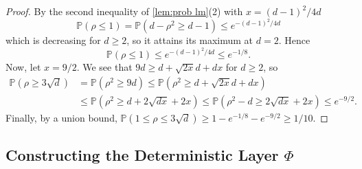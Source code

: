 \documentclass[aoap]{imsart}
\numberwithin{equation}{section}
\theoremstyle{definition}
\theoremstyle{remark}
\numberwithin{equation}{section}
\newcommand{\0}{\mathbf{0}}
\newcommand{\1}{\mathbf{1}}
\renewcommand{\P}{\mathbb{P}}
\numberwithin{equation}{section}
\begin{document}
\begin{proof} 
By the second inequality of \cref{lem:prob lm}(2) with $x=(d-1)^2/4d$ \[ \P(\rho\leq 1)=\P(d-\rho^2\geq d-1)\leq e^{-(d-1)^2/4d}\] which is decreasing for $d\geq 2$, so it attains its maximum at $d=2$. Hence
\[\P(\rho\leq 1)\leq e^{-(d-1)^2/4d} \leq e^{-1/8}.\]
Now, let $x=9/2$. We see that $9d\geq d+\sqrt{2x}d+dx$ for $d\geq 2$, so
\begin{align*}
\P(\rho \geq 3\sqrt{d})  &= \P(\rho^2 \geq 9d)
\leq \P(\rho^2\geq d+\sqrt{2x}d+dx)
\\ & \leq \P(\rho^2\geq d+2\sqrt{dx}+2x)
\leq \P(\rho^2-d\geq 2\sqrt{dx}+2x)
\leq e^{-9/2}.
\end{align*}
Finally, by a union bound, $\P(1\leq\rho\leq 3\sqrt{d})\geq 1-e^{-1/8}-e^{-9/2}\geq 1/10$.
\end{proof}


\subsection{Constructing the Deterministic Layer $\Phi$}
\end{document}
